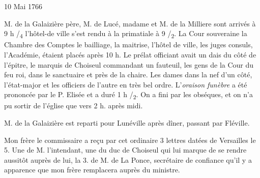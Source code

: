                      \begin{diary}{10 Mai 1766}{}
                        
                        
                           M. de la Galaizière père, M. de
                              Lucé, madame et
                           M. de la
                              Milliere sont arrivés à 9 h /\textsubscript{4}
                           l'hôtel-de ville s'est rendu à
                              la primatiale
                           à 9 /\textsubscript{2}. La Cour souveraine
                           la Chambre des Comptes
                           le bailliage,
                           la maitrise, l'hôtel de ville, les juges consuls,
                           l'Académie, étaient
                           placés après 10 h. Le
                           prélat officiant avait un dais du côté de
                           l'épitre, le marquis de Choiseul commandant un fauteuil, les
                           gens de la Cour du feu roi,
                           dans le sanctuaire
                           et près de la chaire. Les dames dans la
                           nef d'un côté, l’état-major et les officiers
                           de l'autre en très bel ordre. L'\emph{oraison
                                 funèbre}
                           a été prononcée par le P. Elisée
                           et a duré
                           1 h /\textsubscript{2}. On a fini par les
                           obséques, et on
                           n'a pu sortir de l’église que vers 2 h. après
                           midi. \bigskip
        
        
                        
                           M. de la Galaizière est reparti pour Lunéville
                           après dîner, passant par Fléville. \bigskip
        
        
                        
                           Mon frère le commissaire a reçu par cet
                           ordinaire 3 lettres datées de Versailles
                           le 5.
                           Une de M. l'intendant, une du
                              duc
                              de Choiseul qui lui marque de se rendre
                           aussitôt auprès de lui, la 3. de M. de La Ponce,
                           secrétaire de confiance qu'il y a apparence
                           que mon frère
                           remplacera auprès du ministre.
                        \bigskip
        
        
                     \end{diary}
